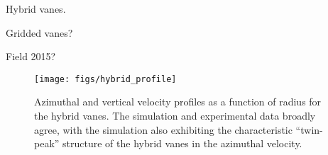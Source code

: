 \label{app-validation}


%
%
%
%
%
%
%
%
%
%
%

Hybrid vanes. %

Gridded vanes?

Field 2015?

\begin{figure}[!htb]
  \begin{center}
   \texttt{[image: figs/hybrid\_profile]}
   \caption{Azimuthal and vertical velocity profiles as a function of
   radius for the hybrid vanes. The simulation and experimental data
   broadly agree, with the simulation also exhibiting the characteristic
   ``twin-peak'' structure of the hybrid vanes in the azimuthal velocity. }
   \label{fig:lab}
  \end{center}
\end{figure}




